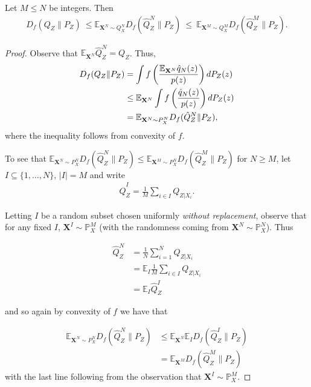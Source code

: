 \setcounter{proposition}{0}
\begin{proposition}
Let $M \leq N$ be integers. Then
\begin{align*}
    D_f(Q_Z \| P_Z) \ \leq 
    \mathbb{E}_{\mathbf{X}^N \sim Q_{X}^N} D_f( \hat{Q}_Z^N \| P_Z) \  \leq \ \mathbb{E}_{\mathbf{X}^M \sim Q_{X}^M} D_f( \hat{Q}_Z^M \| P_Z).
\end{align*}
\end{proposition}
\begin{proof}
Observe that $\mathbb{E}_{\mathbf{X}^N} \hat{Q}_Z^N = Q_Z$. Thus,
\begin{align*}
    D_f(Q_Z \| P_Z) &= \int f\left(\frac{\mathbb{E}_{\mathbf{X}^N}\hat{q}_N(z)}{p(z)}\right) dP_Z(z) \\
    &\leq \mathbb{E}_{\mathbf{X}^N} \int f\left(\frac{\hat{q}_N(z)}{p(z)}\right) dP_Z(z)\\
    &=\mathbb{E}_{\mathbf{X}^N \sim P_{X}^N} D_f( \hat{Q}_Z^N \| P_Z),
\end{align*}
where the inequality follows from convexity of $f$.

To see that $\mathbb{E}_{\mathbf{X}^N \sim P_{X}^N} D_f( \hat{Q}_Z^N \| P_Z) \leq \mathbb{E}_{\mathbf{X}^M \sim P_{X}^N} D_f( \hat{Q}_Z^M \| P_Z)$ for $N \geq M$,
let $I \subseteq \{1, \ldots, N\}$, $|I| = M$ and write
\begin{align*}
    \hat{Q}_Z^I = \frac{1}{M} \sum_{i \in I} Q_{Z | X_i}.
\end{align*}

Letting $I$ be a random subset chosen uniformly \emph{without replacement},
observe that for any fixed $I$, $\mathbf{X}^I \sim \mathbb{P}_X^M$ (with the randomness coming from $\mathbf{X}^N \sim \mathbb{P}_X^N$). Thus

\begin{align*}
    \hat{Q}_Z^N &= \frac{1}{N} \sum_{i=1}^N Q_{Z|X_i} \\
    &= \mathbb{E}_I \frac{1}{M} \sum_{i \in I} Q_{Z|X_i} \\
    &= \mathbb{E}_I \hat{Q}_Z^I
\end{align*}

and so again by convexity of $f$ we have that

\begin{align}
    \mathbb{E}_{\mathbf{X}^N \sim P_{X}^N} D_f( \hat{Q}_Z^N \| P_Z) &\leq  \mathbb{E}_{\mathbf{X}^N} \mathbb{E}_I D_f( \hat{Q}_Z^I \| P_Z) \\
    &= \mathbb{E}_{\mathbf{X}^M} D_f(\hat{Q}_Z^M \| P_Z)
\end{align}
with the last line following from the observation that $\mathbf{X}^I \sim \mathbb{P}_X^M$.
\end{proof}




